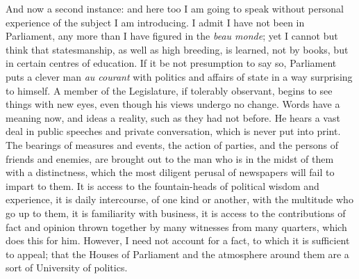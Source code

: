 And now a second instance: and here too I am going to speak
without personal experience of the subject I am introducing. I admit I
have not been in Parliament, any more than I have figured in the \emph{beau
monde}; yet I cannot but think that statesmanship, as well as high
breeding, is learned, not by books, but in certain centres of
education. If it be not presumption to say so, Parliament puts a
clever man \emph{au courant} with politics and affairs of state in a
way surprising to himself. A member of the Legislature, if tolerably
observant, begins to see things with new eyes, even though his views
undergo no change. Words have a meaning now, and ideas a reality, such
as they had not before. He hears a vast deal in public speeches and
private conversation, which is never put into print. The bearings of
measures and events, the action of parties, and the persons of friends
and enemies, are brought out to the man who is in the midst of them
with a distinctness, which the most diligent perusal of newspapers
will fail to impart to them. It is access to the fountain-heads of
political wisdom and experience, it is daily intercourse, of one kind
or another, with the multitude who go up to them, it is familiarity
with business, it is access to the contributions of fact and opinion
thrown together by many witnesses from many quarters, which does this
for him. However, I need not account for a fact, to which it is
sufficient to appeal; that the Houses of Parliament and the atmosphere
around them are a sort of University of politics.

